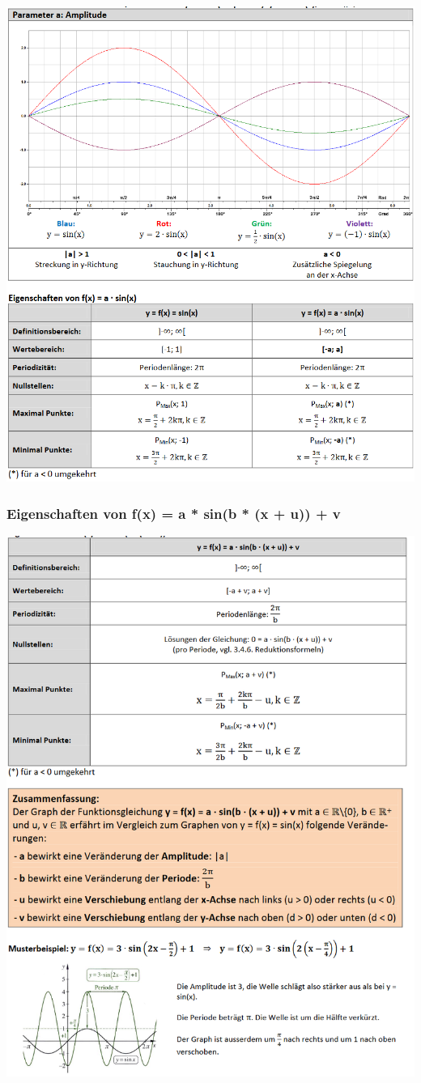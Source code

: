 \includegraphics[scale=0.8]{sinus1.PNG}
\subsubsection{Eigenschaften von f(x) = a * sin(b * (x + u)) + v}
\includegraphics[scale=0.7 ]{sinmax.PNG}

